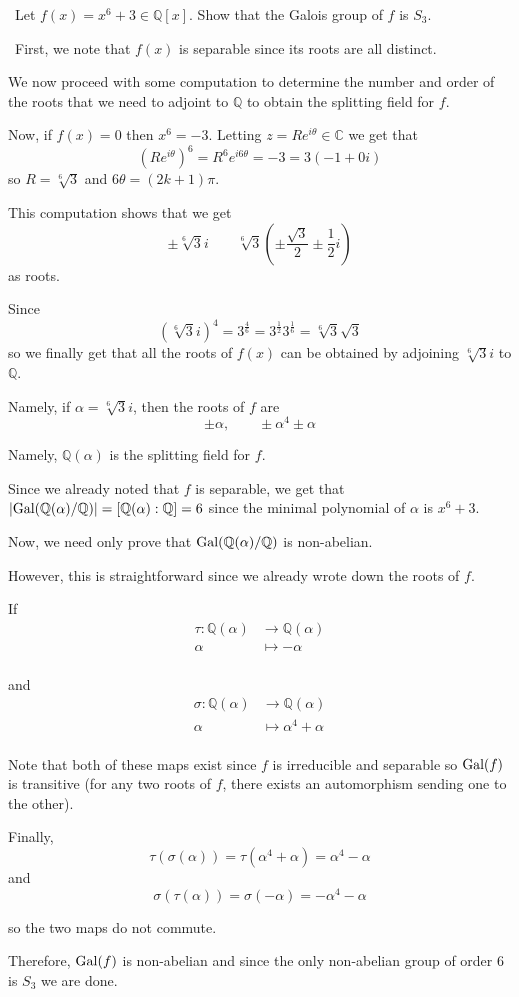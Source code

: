 \documentclass[12pt]{Qual}
\begin{document}
\begin{problem} $\,$
Let $f(x)=x^6+3\in\mathbb{Q}[x].$ Show that the Galois group of $f$ is $S_3$.
\end{problem}


\begin{solution}$\,$
First, we note that $f(x)$ is separable since its roots are all distinct.

We now proceed with some computation to determine the number and order of the roots that we need to adjoint to $\mathbb{Q}$ to obtain the splitting field for $f$.

Now, if $f(x)=0$ then $x^6=-3$. Letting $z=Re^{i\theta}\in\mathbb{C}$ we get that $$(Re^{i\theta})^6=R^6e^{i6\theta}=-3=3(-1+0i)$$ so $R=\sqrt[6]{3}$ and $6\theta=(2k+1)\pi.$

This computation shows that we get $$\pm\sqrt[6]{3}i\qquad \sqrt[6]{3}\left(\pm\frac{\sqrt{3}}{2}\pm\frac{1}{2}i\right)$$ as roots.

Since $$(\sqrt[6]{3}i)^4=3^{\frac{4}{6}}=3^{\frac{1}{2}}3^{\frac{1}{6}}=\sqrt[6]{3}\sqrt{3}$$ so we finally get that all the roots of $f(x)$ can be obtained by adjoining $\sqrt[6]{3}i$ to $\mathbb{Q}$.

Namely, if $\alpha=\sqrt[6]{3}i$, then the roots of $f$ are $$\pm \alpha,\qquad \pm \alpha^4\pm \alpha$$

Namely, $\mathbb{Q}(\alpha)$ is the splitting field for $f$.

Since we already noted that $f$ is separable, we get that $|\text{Gal}(\mathbb{Q}(\alpha)/\mathbb{Q})|=[\mathbb{Q}(\alpha):\mathbb{Q}]=6$ since the minimal polynomial of $\alpha$ is $x^6+3.$

Now, we need only prove that $\text{Gal}(\mathbb{Q}(\alpha)/\mathbb{Q})$ is non-abelian.

However, this is straightforward since we already wrote down the roots of $f$.

If \begin{align*}
    \tau:\mathbb{Q}(\alpha)&\to\mathbb{Q}(\alpha)\\
    \alpha&\mapsto -\alpha\\
\end{align*}

and \begin{align*}
    \sigma:\mathbb{Q}(\alpha)&\to\mathbb{Q}(\alpha)\\
    \alpha&\mapsto \alpha^4+\alpha\\
\end{align*}

Note that both of these maps exist since $f$ is irreducible and separable so $\text{Gal}(f)$ is transitive (for any two roots of $f$, there exists an automorphism sending one to the other).

Finally, $$\tau(\sigma(\alpha))=\tau(\alpha^4+\alpha)=\alpha^4-\alpha$$ and $$\sigma(\tau(\alpha))=\sigma(-\alpha)=-\alpha^4-\alpha$$

so the two maps do not commute.

Therefore, $\text{Gal}(f)$ is non-abelian and since the only non-abelian group of order $6$ is $S_3$ we are done.


\end{solution}
\newpage
\end{document}
